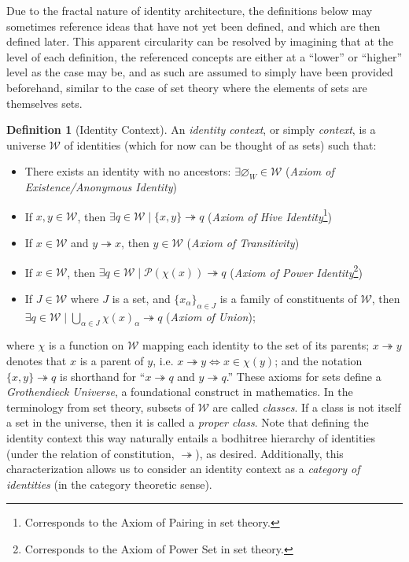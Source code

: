 \documentclass[pra,twocolumn,groupedaddress,10pt]{revtex4}
\theoremstyle{definition}
\newtheorem{defn}{Definition}[section]
\begin{document}
Due to the fractal nature of identity architecture, the definitions below may sometimes reference ideas that have not yet been defined, and which are then defined later. This apparent circularity can be resolved by imagining that at the level of each definition, the referenced concepts are either at a ``lower'' or ``higher'' level as the case may be, and as such are assumed to simply have been provided beforehand, similar to the case of set theory where the elements of sets are themselves sets.

\begin{defn}[Identity Context]
	An \emph{identity context}, or simply \emph{context}, is a universe $\mathcal{W}$ of identities (which for now can be thought of as sets) such that:
	\begin{itemize}
		\item There exists an identity with no ancestors: $\exists \varnothing_W \in \mathcal{W}$ (\emph{Axiom of Existence/Anonymous Identity})
		\item If $x, y \in \mathcal{W}$, then $\exists q \in \mathcal{W} \mid \{x,y\} \twoheadrightarrow q$ (\emph{Axiom of Hive Identity}\footnote{Corresponds to the Axiom of Pairing in set theory.})
		\item If $x \in \mathcal{W}$ and $y \twoheadrightarrow x$, then $y \in \mathcal{W}$ (\emph{Axiom of Transitivity})
		\item If $x \in \mathcal{W}$, then $\exists q \in \mathcal{W} \mid \mathscr{P}(\chi(x)) \twoheadrightarrow q$ (\emph{Axiom of Power Identity}\footnote{Corresponds to the Axiom of Power Set in set theory.})
		\item If $J \in \mathcal{W}$ where $J$ is a set, and $\{x_{\alpha}\}_{\alpha \in J}$ is a family of constituents of $\mathcal{W}$, then $\exists q \in \mathcal{W} \mid \bigcup_{\alpha \in J} {\chi(x)}_{\alpha} \twoheadrightarrow q$ (\emph{Axiom of Union});
	\end{itemize}
	where $\chi$ is a function on $\mathcal{W}$ mapping each identity to the set of its parents; $x \twoheadrightarrow y$ denotes that $x$ is a parent of $y$, i.e. $x \twoheadrightarrow y \iff x \in \chi(y)$; and the notation $\{x,y\} \twoheadrightarrow q$ is shorthand for ``$x \twoheadrightarrow q$ and $y \twoheadrightarrow q$.'' These axioms for sets define a \emph{Grothendieck Universe}\cite{grothendieck}\cite{foundcat}, a foundational construct in mathematics. In the terminology from set theory, subsets of $\mathcal{W}$ are called \emph{classes}. If a class is not itself a set in the universe, then it is called a \emph{proper class}.
	Note that defining the identity context this way naturally entails a bodhitree hierarchy of identities (under the relation of constitution, $\twoheadrightarrow$), as desired. Additionally, this characterization allows us to consider an identity context as a \emph{category of identities} (in the category theoretic sense).
\end{defn}
\end{document}
